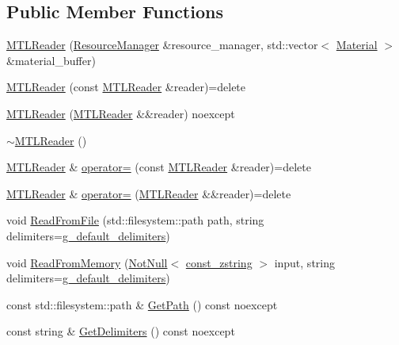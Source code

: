 \subsection*{Public Member Functions}
\begin{DoxyCompactItemize}
\item 
\mbox{\hyperlink{classmage_1_1rendering_1_1loader_1_1_m_t_l_reader_a3615f6899de22b53de1bad257ac34099}{M\+T\+L\+Reader}} (\mbox{\hyperlink{classmage_1_1rendering_1_1_resource_manager}{Resource\+Manager}} \&resource\+\_\+manager, std\+::vector$<$ \mbox{\hyperlink{classmage_1_1rendering_1_1_material}{Material}} $>$ \&material\+\_\+buffer)
\item 
\mbox{\hyperlink{classmage_1_1rendering_1_1loader_1_1_m_t_l_reader_ad359e191af9b96e78660ed7aa313a48a}{M\+T\+L\+Reader}} (const \mbox{\hyperlink{classmage_1_1rendering_1_1loader_1_1_m_t_l_reader}{M\+T\+L\+Reader}} \&reader)=delete
\item 
\mbox{\hyperlink{classmage_1_1rendering_1_1loader_1_1_m_t_l_reader_af6b1842f18fb4a6e6bae435fd0f08496}{M\+T\+L\+Reader}} (\mbox{\hyperlink{classmage_1_1rendering_1_1loader_1_1_m_t_l_reader}{M\+T\+L\+Reader}} \&\&reader) noexcept
\item 
\mbox{\hyperlink{classmage_1_1rendering_1_1loader_1_1_m_t_l_reader_a87a4f9bf27cfe8e7e7d0c13c330775d6}{$\sim$\+M\+T\+L\+Reader}} ()
\item 
\mbox{\hyperlink{classmage_1_1rendering_1_1loader_1_1_m_t_l_reader}{M\+T\+L\+Reader}} \& \mbox{\hyperlink{classmage_1_1rendering_1_1loader_1_1_m_t_l_reader_a1153606ce103d9f667726cf5f66a88d1}{operator=}} (const \mbox{\hyperlink{classmage_1_1rendering_1_1loader_1_1_m_t_l_reader}{M\+T\+L\+Reader}} \&reader)=delete
\item 
\mbox{\hyperlink{classmage_1_1rendering_1_1loader_1_1_m_t_l_reader}{M\+T\+L\+Reader}} \& \mbox{\hyperlink{classmage_1_1rendering_1_1loader_1_1_m_t_l_reader_a057f38f1f720e040b2ab5fa08f42fac4}{operator=}} (\mbox{\hyperlink{classmage_1_1rendering_1_1loader_1_1_m_t_l_reader}{M\+T\+L\+Reader}} \&\&reader)=delete
\item 
void \mbox{\hyperlink{classmage_1_1rendering_1_1loader_1_1_m_t_l_reader_ad4236487534d5dba6582613317317092}{Read\+From\+File}} (std\+::filesystem\+::path path, string delimiters=\mbox{\hyperlink{namespacemage_aa161198415efd9349da6187663250aea}{g\+\_\+default\+\_\+delimiters}})
\item 
void \mbox{\hyperlink{classmage_1_1rendering_1_1loader_1_1_m_t_l_reader_a5aa9068792817b6d6dc840a44b788159}{Read\+From\+Memory}} (\mbox{\hyperlink{namespacemage_a8769f9d670d6b585ea306cb1062af94b}{Not\+Null}}$<$ \mbox{\hyperlink{namespacemage_abfd9206dc607ceb5d13ec68bf075a5c0}{const\+\_\+zstring}} $>$ input, string delimiters=\mbox{\hyperlink{namespacemage_aa161198415efd9349da6187663250aea}{g\+\_\+default\+\_\+delimiters}})
\item 
const std\+::filesystem\+::path \& \mbox{\hyperlink{classmage_1_1rendering_1_1loader_1_1_m_t_l_reader_a9740b3cecdcf5a27c696a08eef3b09da}{Get\+Path}} () const noexcept
\item 
const string \& \mbox{\hyperlink{classmage_1_1rendering_1_1loader_1_1_m_t_l_reader_aa00e1e27b614e11ec9f70e52d0bac551}{Get\+Delimiters}} () const noexcept
\end{DoxyCompactItemize}

